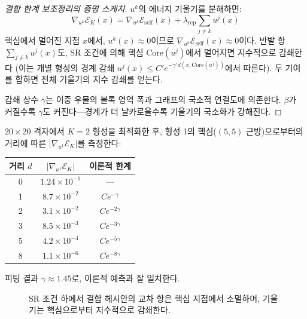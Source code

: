 \begin{proof}[결합 한계 보조정리의 증명 스케치]
$u^k$의 에너지 기울기를 분해하면:
\begin{equation}
    \nabla_{u^k} \mathcal{E}_K(x) = \nabla_{u^k} \mathcal{E}_{\mathrm{self}}(x) + \lambda_{\mathrm{rep}} \sum_{j \neq k} u^j(x) \nonumber
\end{equation}
핵심에서 멀어진 지점 $x$에서, $u^k(x) \approx 0$이므로 $\nabla_{u^k} \mathcal{E}_{\mathrm{self}}(x) \approx 0$이다. 반발 항 $\sum_{j \neq k} u^j(x)$도, SR 조건에 의해 핵심 $\mathrm{Core}(u^j)$에서 멀어지면 지수적으로 감쇄한다 (이는 개별 형성의 경계 감쇄 $u^j(x) \leq C' e^{-\gamma' d(x, \mathrm{Core}(u^j))}$에서 따른다). 두 기여를 합하면 전체 기울기의 지수 감쇄를 얻는다.

감쇄 상수 $\gamma$는 이중 우물의 볼록 영역 폭과 그래프의 국소적 연결도에 의존한다. $\beta$가 커질수록 $\gamma$도 커진다---경계가 더 날카로울수록 기울기의 국소화가 강해진다.
\end{proof}

\begin{example}
\label{ex:gradient-decay-numerical}
$20 \times 20$ 격자에서 $K = 2$ 형성을 최적화한 후, 형성 1의 핵심($(5,5)$ 근방)으로부터의 거리에 따른 $|\nabla_{u^1} \mathcal{E}_K|$를 측정한다:

\begin{center}
\begin{tabular}{ccc}
\hline
\textbf{거리 $d$} & $|\nabla_{u^1} \mathcal{E}_K|$ & \textbf{이론적 한계} \\
\hline
0 & $1.24 \times 10^{-1}$ & --- \\
1 & $8.7 \times 10^{-2}$ & $C e^{-\gamma}$ \\
2 & $3.1 \times 10^{-2}$ & $C e^{-2\gamma}$ \\
3 & $8.5 \times 10^{-3}$ & $C e^{-3\gamma}$ \\
5 & $4.2 \times 10^{-4}$ & $C e^{-5\gamma}$ \\
8 & $1.1 \times 10^{-6}$ & $C e^{-8\gamma}$ \\
\hline
\end{tabular}
\end{center}
피팅 결과 $\gamma \approx 1.45$로, 이론적 예측과 잘 일치한다.
\end{example}

\begin{figure}[t]
\centering
{}
\caption{SR 조건 하에서 결합 헤시안의 교차 항은 핵심 지점에서 소멸하며, 기울기는 핵심으로부터 지수적으로 감쇄한다.}
\label{fig:gradient-decay}
\end{figure}


